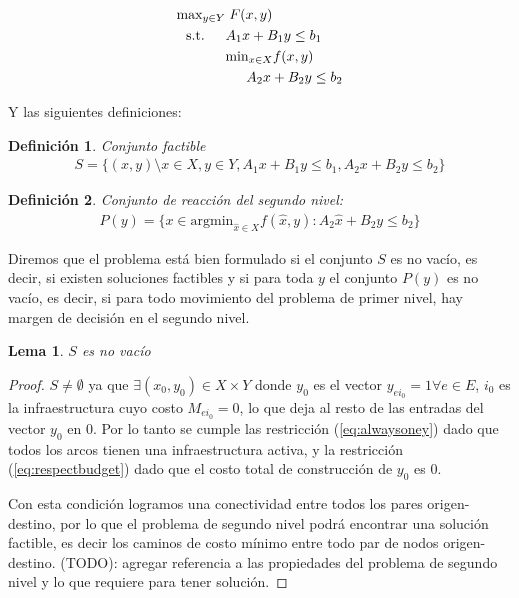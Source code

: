\documentclass{article}
\newtheorem{definition}{Definición}
\newtheorem{lemma}{Lema}
\newcommand{\modelspace}{\hspace{1.5em}}
\begin{document}
  \begin{align}
    \text{max}_{y \in Y}    & \; F(x, y) \\
    \text{s.t.} \modelspace & A_1 x + B_1 y \leq b_1 \\
                            & \text{min}_{x \in X} f(x, y) \\
                            & \modelspace A_2 x + B_2 y \leq b_2
  \end{align}

  Y las siguientes definiciones:

  \begin{definition}
    Conjunto factible
    \begin{align}
      S = \{(x, y) \setminus x \in X, y \in Y, A_1 x + B_1 y \leq b_1, A_2 x + B_2 y \leq b_2 \}
    \end{align}
  \end{definition}

  \begin{definition}
    Conjunto de reacción del segundo nivel:
    \begin{align}
      P(y) = \{ x \in \text{argmin}_{\hat{x} \in X} f(\hat{x}, y) : A_2 \hat{x} + B_2 y \leq b_2 \}
    \end{align}
  \end{definition}

  Diremos que el problema está bien formulado si el conjunto $S$ es no vacío, es decir, si existen soluciones factibles y si para toda $y$ el conjunto $P(y)$ es no vacío, es decir, si para todo movimiento del problema de primer nivel, hay margen de decisión en el segundo nivel.

  \begin{lemma}$S$ es no vacío
  \end{lemma}

  \begin{proof}
    $S \neq \emptyset$ ya que $\exists (x_0, y_0) \in X \times Y$ donde $y_0$ es el vector $y_{ei_0} = 1 \forall e \in E$, $i_0$ es la infraestructura cuyo costo $M_{ei_0} = 0$, lo que deja al resto de las entradas del vector $y_0$ en $0$. Por lo tanto se cumple las restricción (\ref{eq:alwaysoney}) dado que todos los arcos tienen una infraestructura activa, y la restricción (\ref{eq:respectbudget}) dado que el costo total de construcción de $y_0$ es $0$.

    Con esta condición logramos una conectividad entre todos los pares origen-destino, por lo que el problema de segundo nivel podrá encontrar una solución factible, es decir los caminos de costo mínimo entre todo par de nodos origen-destino.
    (TODO): agregar referencia a las propiedades del problema de segundo nivel y lo que requiere para tener solución.
  \end{proof}
\end{document}

